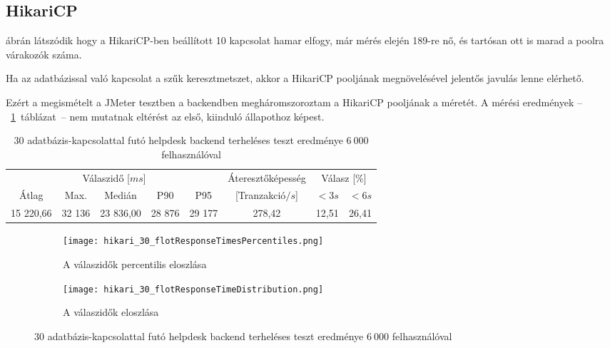 \subsection{HikariCP}\label{sec:hikari}
 ábrán látszódik hogy a HikariCP-ben beállított 10 kapcsolat hamar elfogy, már mérés elején 189-re nő, és tartósan ott is marad a poolra várakozók száma.

Ha az adatbázissal való kapcsolat a szűk keresztmetszet, akkor a HikariCP pooljának megnövelésével jelentős javulás lenne elérhető.

Ezért a megismételt a JMeter tesztben a backendben megháromszoroztam a HikariCP pooljának a méretét. A mérési eredmények --~\ref{tabl:hikari_30}~táblázat~-- nem mutatnak eltérést az első, kiinduló állapothoz képest.

\begin{table}[hbt]
	\begin{tabular}{ccccc|c|cc}
		\multicolumn{5}{c|}{Válaszidő [$ms$]}  & Áteresztőképesség & \multicolumn{2}{c}{Válasz [\%]}	\\
		Átlag & Max. & Medián & P90 & P95 &	[Tranzakció$/s$] & $<3s$& $<6s$ \\
		\hline 
		15 220,66 & 32 136 & 23 836,00 & 28 876 & 29 177 & 278,42 & 12,51 & 26,41 \\
	\end{tabular} 
	\caption{30 adatbázis-kapcsolattal futó helpdesk backend terheléses teszt eredménye $6~000$ felhasználóval}
	\label{tabl:hikari_30}
\end{table}



\begin{figure}[hbt]
	\begin{subfigure}{.49\textwidth}
		\centering
		\texttt{[image: hikari\_30\_flotResponseTimesPercentiles.png]}  
		\caption{A válaszidők percentilis eloszlása}
	\end{subfigure}
	\begin{subfigure}{.49\textwidth}
		\centering
		\texttt{[image: hikari\_30\_flotResponseTimeDistribution.png]}  
		\caption{A válaszidők eloszlása}
	\end{subfigure}
	
	\caption[Helpdesk backend terheléses teszt módosított HikariCp beállításokkal]{30 adatbázis-kapcsolattal futó helpdesk backend terheléses teszt eredménye $6~000$ felhasználóval}
\end{figure}


